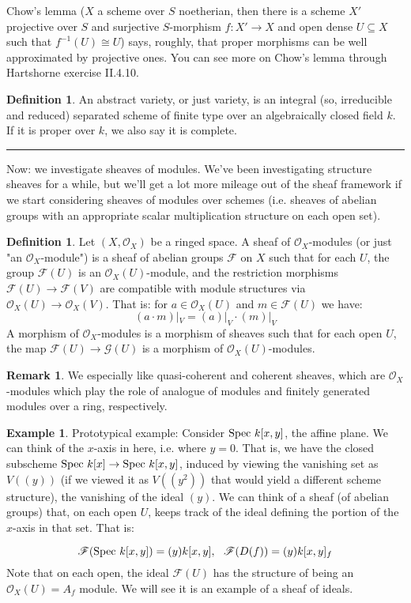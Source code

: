 \documentclass[10pt,reqno]{amsart}
\theoremstyle{definition}
\newtheorem{example}[theorem]{Example}
\newtheorem{definition}[theorem]{Definition}
\newtheorem{remark}[theorem]{Remark}
\theoremstyle{remark}
\numberwithin{equation}{section}
\numberwithin{theorem}{section}
\newcommand{\OO}{{\mathcal O}}
\newcommand{\spec}{\textup{Spec }}
\newcommand{\FF}{{\mathscr F}}
\newcommand{\GG}{{\mathscr G}}
\begin{document}
Chow's lemma ($X$ a scheme over $S$ noetherian, then there is a scheme $X'$ projective over $S$ and surjective $S$-morphism $f: X' \to X$ and open dense $U \subseteq X$ such that $f^{-1}(U) \cong U$) says, roughly, that proper morphisms can be well approximated by projective ones. You can see more on Chow's lemma through Hartshorne exercise II.4.10.

\begin{definition} An abstract variety, or just variety, is an integral (so, irreducible and reduced) separated scheme of finite type over an algebraically closed field $k$. If it is proper over $k$, we also say it is complete.
\end{definition}

\hrule
\vspace{1em}

Now: we investigate sheaves of modules. We've been investigating structure sheaves for a while, but we'll get a lot more mileage out of the sheaf framework if we start considering sheaves of modules over schemes (i.e. sheaves of abelian groups with an appropriate scalar multiplication structure on each open set). 

\begin{definition} Let $(X,\OO_X)$ be a ringed space. A sheaf of $\OO_X$-modules (or just "an $\OO_X$-module") is a sheaf of abelian groups $\FF$ on $X$ such that for each $U$, the group $\FF(U)$ is an $\OO_X(U)$-module, and the restriction morphisms $\FF(U) \to \FF(V)$ are compatible with module structures via $\OO_X(U) \to \OO_X(V)$. That is: for $a \in \OO_X(U)$ and $m \in \FF(U)$ we have:
\[(a\cdot m)|_V = (a)|_V \cdot (m)|_V \]
A morphism of $\OO_X$-modules is a morphism of sheaves such that for each open $U$, the map $\FF(U) \to \GG(U)$ is a morphism of $\OO_X(U)$-modules.
\end{definition}

\begin{remark} We especially like quasi-coherent and coherent sheaves, which are $\OO_X$-modules which play the role of analogue of modules and finitely generated modules over a ring, respectively.
\end{remark}

\begin{example} Prototypical example: Consider $\spec k[x,y]$, the affine plane. We can think of the $x$-axis in here, i.e. where $y=0$. That is, we have the closed subscheme $\spec k[x] \to \spec k[x,y]$, induced by viewing the vanishing set as $V((y))$ (if we viewed it as $V((y^2))$ that would yield a different scheme structure), the vanishing of the ideal $(y)$. We can think of a sheaf (of abelian groups) that, on each open $U$, keeps track of the ideal defining the portion of the $x$-axis in that set. That is:

\[\FF(\spec k[x,y]) = (y)k[x,y], \ \ \FF(D(f)) = (y)k[x,y]_{f}\]
Note that on each open, the ideal $\FF(U)$ has the structure of being an $\OO_X(U) = A_f$ module. We will see it is an example of a sheaf of ideals.

\end{example}
\end{document}
